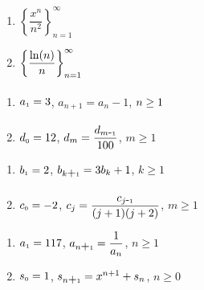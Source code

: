 \begin{multicols}{2}
\begin{enumerate}
\setcounter{enumi}{\value{HW}}

\item $\left\{ \dfrac{x^{n}}{n^{2}} \right\}_{n=1}^{\infty}$
\item $\left\{ \dfrac{\ln(n)}{n} \right\}_{n=1}^{\infty} \vphantom{\left\{ \dfrac{x^{n}}{n^{2}} \right\}_{n=1}^{\infty}}$

\setcounter{HW}{\value{enumi}}
\end{enumerate}
\end{multicols}

\begin{multicols}{2}
\begin{enumerate}
\setcounter{enumi}{\value{HW}}
 
\item  $a_{\mbox{\tiny$1$}} = 3$, $a_{n+1} = a_{n} - 1$, $n \geq 1 \vphantom{d_{m} = \dfrac{d_{m\mbox{-\tiny$1$}}}{100}}$
\item  $d_{\mbox{\tiny$0$}} = 12$, $d_{m} = \dfrac{d_{m\mbox{-\tiny$1$}}}{100}$, $m \geq 1$

\setcounter{HW}{\value{enumi}}
\end{enumerate}
\end{multicols}

\begin{multicols}{2}
\begin{enumerate}
\setcounter{enumi}{\value{HW}}

\item  $b_{\mbox{\tiny$1$}} = 2$, $b_{k\mbox{+\tiny$1$}} =3b_{k}+1 \vphantom{\dfrac{c_{j\mbox{-\tiny$1$}}}{(j+1)(j+2)}}$, $k \geq 1$
\item  $c_{\mbox{\tiny$0$}} = -2$, $c_{j} = \dfrac{c_{j\mbox{-\tiny$1$}}}{(j+1)(j+2)}$,  $m \geq 1$

\setcounter{HW}{\value{enumi}}
\end{enumerate}
\end{multicols}

\begin{multicols}{2}
\begin{enumerate}
\setcounter{enumi}{\value{HW}}

\item  $a_{\mbox{\tiny$1$}} = 117$, $a_{n\mbox{+\tiny$1$}} = \dfrac{1}{a_{n}}$, $n \geq 1$
\item  $s_{\mbox{\tiny$0$}} = 1$, $s_{n\mbox{+\tiny$1$}} = x^{n + 1} + s_{n}$, $n \geq 0$

\setcounter{HW}{\value{enumi}}
\end{enumerate}
\end{multicols}


